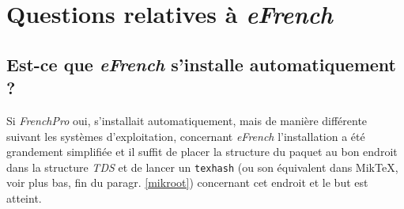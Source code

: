 \documentclass[a4paper,12pt,openright]{article}
\begin{document}
\section{Questions relatives à \textit{eFrench}}
\subsection{Est-ce que \textit{eFrench} s'installe automatiquement ?}
\begin{MAJ}
 Si \textit{FrenchPro} oui, s'installait automatiquement, mais de manière différente
suivant les systèmes d'exploitation,  concernant \textit{eFrench} l'installation a été
grandement simplifiée et il suffit de placer la structure du paquet au bon endroit
dans la structure \textit{TDS}
et de lancer un \texttt{texhash} (ou son équivalent dans Mik\TeX{}, 
voir plus bas, fin du paragr. \ref{mikroot})
concernant cet endroit et le but est atteint.

\end{MAJ}
\end{document}
